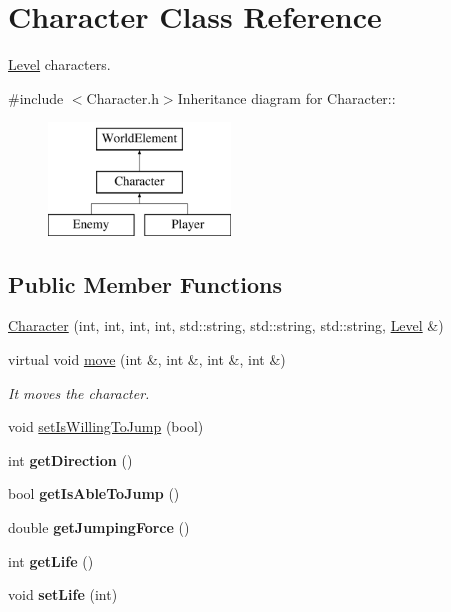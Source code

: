 \hypertarget{classCharacter}{
\section{Character Class Reference}
\label{classCharacter}
}


\hyperlink{classLevel}{Level} characters.  


{\ttfamily \#include $<$Character.h$>$}Inheritance diagram for Character::\begin{figure}[H]
\begin{center}
\leavevmode
\includegraphics[height=3cm]{classCharacter}
\end{center}
\end{figure}
\subsection*{Public Member Functions}
\begin{DoxyCompactItemize}
\item 
\hyperlink{classCharacter_a38fd0fe8b748b17cfda79f3c8b4e3e58}{Character} (int, int, int, int, std::string, std::string, std::string, \hyperlink{classLevel}{Level} \&)
\item 
virtual void \hyperlink{classCharacter_a20727808aa2d7c646c7fe209801bae1f}{move} (int \&, int \&, int \&, int \&)
\begin{DoxyCompactList}\small\item\em It moves the character. \item\end{DoxyCompactList}\item 
void \hyperlink{classCharacter_a79111ebd8a8da953f15312adde87bec9}{setIsWillingToJump} (bool)
\item 
\hypertarget{classCharacter_a7dffb61b5343fff4c122143919c5bae0}{
int {\bfseries getDirection} ()}
\label{classCharacter_a7dffb61b5343fff4c122143919c5bae0}

\item 
\hypertarget{classCharacter_ae030adc5c8aa5e934f918b6d6185d493}{
bool {\bfseries getIsAbleToJump} ()}
\label{classCharacter_ae030adc5c8aa5e934f918b6d6185d493}

\item 
\hypertarget{classCharacter_a81bb0c825cf6ed1fefde938e459183ea}{
double {\bfseries getJumpingForce} ()}
\label{classCharacter_a81bb0c825cf6ed1fefde938e459183ea}

\item 
\hypertarget{classCharacter_a1e00eede43aa9b436b0cbd2127ab251a}{
int {\bfseries getLife} ()}
\label{classCharacter_a1e00eede43aa9b436b0cbd2127ab251a}

\item 
\hypertarget{classCharacter_a8e59bdcbc422df338cea33f932c9a9d8}{
void {\bfseries setLife} (int)}
\label{classCharacter_a8e59bdcbc422df338cea33f932c9a9d8}

\end{DoxyCompactItemize}
